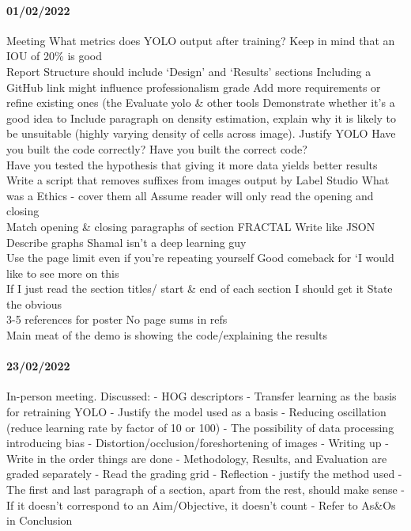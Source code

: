 \begin{appendices}
\paragraph{01/02/2022}
Meeting
What metrics does YOLO output after training? Keep in mind that an IOU of 20\% is good\\

Report
Structure should include ‘Design’ and ‘Results’ sections
Including a GitHub link might influence professionalism grade
Add more requirements or refine existing ones (the 
Evaluate yolo & other tools
Demonstrate whether it’s a good idea to 
Include paragraph on density estimation, explain why it is likely to be unsuitable (highly varying density of cells across image). Justify YOLO
Have you built the code correctly? Have you built the correct code?\\

Have you tested the hypothesis that giving it more data yields better results
Write a script that removes suffixes from images output by Label Studio
What was a 
Ethics - cover them all
Assume reader will only read the opening and closing\\

Match opening \& closing paragraphs of section
FRACTAL
Write like JSON
Describe graphs
Shamal isn’t a deep learning guy\\

Use the page limit even if you’re repeating yourself
Good comeback for ‘I would like to see more on this\\

If I just read the section titles/ start \& end of each section I should get it
State the obvious\\

3-5 references for poster
No page sums in refs\\

Main meat of the demo is showing the code/explaining the results


\paragraph{23/02/2022}
In-person meeting. Discussed:
- HOG descriptors
- Transfer learning as the basis for retraining YOLO
  - Justify the model used as a basis
- Reducing oscillation (reduce learning rate by factor of 10 or 100)
- The possibility of data processing introducing bias
- Distortion/occlusion/foreshortening of images
- Writing up
  - Write in the order things are done
  - Methodology, Results, and Evaluation are graded separately
  - Read the grading grid
  - Reflection - justify the method used
  - The first and last paragraph of a section, apart from the rest, should make sense
  - If it doesn't correspond to an Aim/Objective, it doesn't count
  - Refer to As\&Os in Conclusion
  

\end{appendices}
